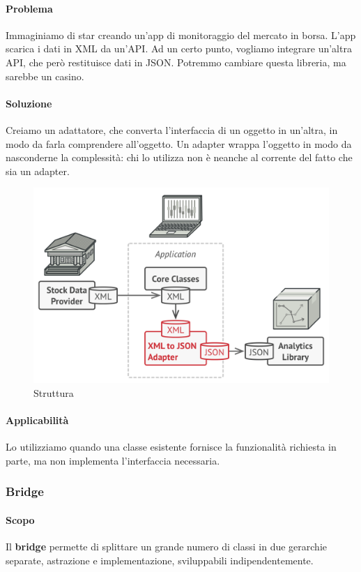 \documentclass[11pt]{article}
\begin{document}
\paragraph{Problema}
Immaginiamo di star creando un'app di monitoraggio del mercato in borsa. L'app scarica i dati in XML da un'API. Ad un certo punto, vogliamo integrare un'altra API, che però restituisce dati in JSON. Potremmo cambiare questa libreria, ma sarebbe un casino. 
\paragraph{Soluzione}
Creiamo un adattatore, che converta l'interfaccia di un oggetto in un'altra, in modo da farla comprendere all'oggetto. Un adapter wrappa l'oggetto in modo da nasconderne la complessità: chi lo utilizza non è neanche al corrente del fatto che sia un adapter. 
\begin{figure}[H]
    \centering
    \includegraphics[width=\linewidth]{res/teoria/Adapter.png}
    \caption{Struttura}
\end{figure}
\paragraph{Applicabilità}
Lo utilizziamo quando una classe esistente fornisce la funzionalità richiesta in parte, ma non implementa l'interfaccia necessaria.

\subsubsection{Bridge}
\paragraph{Scopo}
Il \textbf{bridge} permette di splittare un grande numero di classi in due gerarchie separate, astrazione e implementazione, sviluppabili indipendentemente. 
\end{document}

